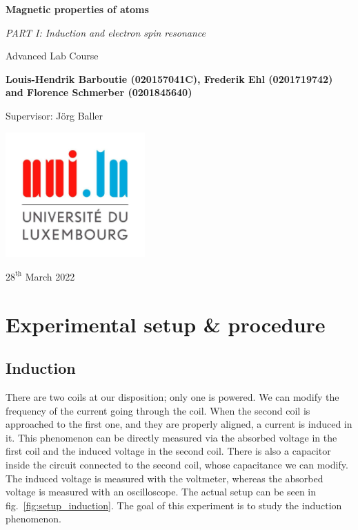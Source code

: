 \documentclass{scrartcl}
\begin{document}
\begin{titlepage}
    \begin{center}
        \vspace*{1cm}
        \Huge
        \textbf{Magnetic properties of atoms}
        
        \vspace{0.5cm}
        \LARGE
        \textit{PART I: Induction and electron spin resonance}
        
        \vspace{0.5cm}
        \LARGE
        Advanced Lab Course
        
        \vspace{1.5cm}
        \textbf{Louis-Hendrik Barboutie (020157041C), Frederik Ehl (0201719742) and Florence Schmerber (0201845640)}
        
        \vspace{1cm}
        Supervisor: Jörg Baller
        \vfill
        

        \includegraphics[width=0.4\textwidth]{logo_uni.jpg}
        
        \Large
        $28^{\underline{\text{th}}}$ March 2022
    \end{center}
\end{titlepage}

\section{Experimental setup \& procedure}

\subsection{Induction}
There are two coils at our disposition; only one is powered. We can modify the frequency of the current going through the coil. When the second coil is approached to the first one, and they are properly aligned, a current is induced in it. This phenomenon can be directly measured via the absorbed voltage in the first coil and the induced voltage in the second coil. There is also a capacitor inside the circuit connected to the second coil, whose capacitance we can modify. The induced voltage is measured with the voltmeter, whereas the absorbed voltage is measured with an oscilloscope. The actual setup can be seen in fig.~\ref{fig:setup_induction}. The goal of this experiment is to study the induction phenomenon.
\end{document}
